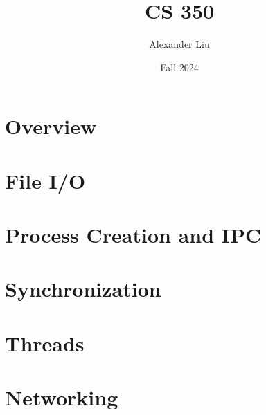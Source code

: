 \documentclass[10pt, oneside]{article}
\title{CS 350}
\author{Alexander Liu}
\date{Fall 2024}
\begin{document}
\maketitle
\tableofcontents

\vspace{.25in}
\newpage
\section{Overview}


\section{File I/O}


\section{Process Creation and IPC}


\section{Synchronization}


\section{Threads}


\section{Networking}


\end{document}
